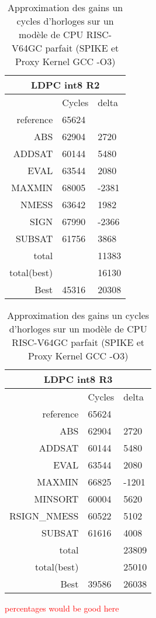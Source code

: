 
\begin{table}[tb]
\centering
    \begin{tabular}{|r|l|l|}
        \toprule
            \multicolumn{3}{|c|}{LDPC int8 R2} \\ \midrule
                        & Cycles    & delta  \\ \midrule
            reference   & 65624     &        \\ \midrule
            ABS         & 62904     & 2720   \\ \midrule
            ADDSAT      & 60144     & 5480   \\ \midrule
            EVAL        & 63544     & 2080   \\ \midrule
            MAXMIN      & 68005     & -2381  \\ \midrule
            NMESS       & 63642     & 1982   \\ \midrule
            SIGN        & 67990     & -2366  \\ \midrule
            SUBSAT      & 61756     & 3868   \\ \midrule
            total       &           & 11383  \\ \midrule
            total(best) &           & 16130  \\ \midrule
            Best        & 45316     & 20308 \\
            \bottomrule
    \end{tabular}  
         \begin{tabular}{|r|l|l|}
         \toprule
             \multicolumn{3}{|c|}{LDPC int8 R3} \\ \midrule
                         & Cycles    & delta  \\ \midrule
             reference   & 65624     &        \\ \midrule
             ABS         & 62904     & 2720   \\ \midrule
             ADDSAT      & 60144     & 5480   \\ \midrule
             EVAL        & 63544     & 2080   \\ \midrule
             MAXMIN      & 66825     & -1201  \\ \midrule
             MINSORT     & 60004     & 5620   \\ \midrule
             RSIGN\_NMESS & 60522     & 5102   \\ \midrule
             SUBSAT      & 61616     & 4008   \\ \midrule
             total       &           & 23809  \\ \midrule
             total(best) &           & 25010  \\ \midrule
             Best        & 39586     & 26038 \\
             \bottomrule
     \end{tabular}  
\caption{Approximation des gains un cycles d'horloges sur un modèle de CPU RISC-V64GC parfait (SPIKE et Proxy Kernel GCC -O3)}
\textcolor{red}{percentages would be good here}
\label{ldpc_theo}
\end{table}